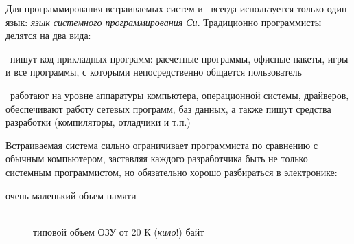 \clearpage
Для программирования встраиваемых систем и \ всегда
используется только один язык: \emph{язык системного программирования
Си}.
Традиционно программисты делятся на два вида:
\begin{description}[nosep]
\item[прикладные программисты (верхнего уровня)]\ пишут код прикладных программ:
расчетные программы, офисные пакеты, игры и все программы, с
которыми непосредственно общается пользователь
\item[системные программисты (нижнего уровня)]\ работают на уровне аппаратуры
компьютера, операционной системы, драйверов, обеспечивают работу сетевых
программ, баз данных, а также пишут средства разработки (компиляторы, отладчики
и т.п.)
\end{description}


Встраиваемая система сильно ограничивает программиста по сравнению с обычным
компьютером, заставляя каждого разработчика быть не только системным
программистом, но обязательно хорошо разбираться в электронике:
\begin{description}
\item[очень маленький объем памяти]\ \\типовой объем ОЗУ от 20 К (\emph{кило}!)
байт
\end{description}

\secup


\secup
